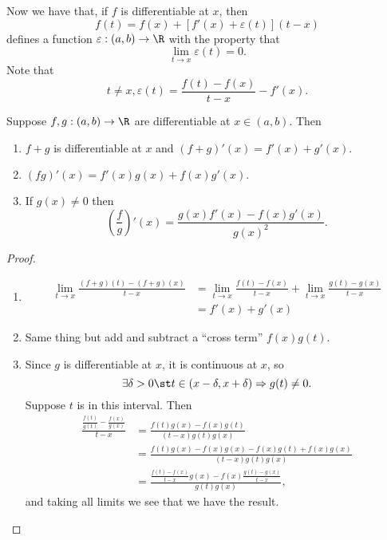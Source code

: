 \documentclass{notes}
\begin{document}
Now we have that, if $f$ is differentiable at $x$, then $$f(t) = f(x) + \left[ f'(x) + \varepsilon(t) \right]
(t-x)$$ defines a function $\varepsilon: (a,b) \to \R$ with the property that $$\lim_{t\to x} \varepsilon(t)
= 0.$$ Note that $$t\neq x, \varepsilon(t) = \frac{f(t) - f(x)}{t - x} - f'(x).$$

\begin{theorem}
  Suppose $f,g: (a,b) \to \R$ are differentiable at $x \in (a,b)$. Then 
  \begin{enumerate}
    \item $f + g$ is differentiable at $x$ and $(f + g)'(x) = f'(x) + g'(x)$.
    \item $(fg)'(x) = f'(x)g(x) + f(x)g'(x).$
    \item If $g(x) \neq 0$ then $$\left( \frac{f}{g} \right)'(x) = \frac{g(x)f'(x) - f(x)g'(x)}{g(x)^2}.$$
  \end{enumerate}
\end{theorem}
\begin{proof}\leavevmode
  \begin{enumerate}
    \item 
      \begin{align*}
        \lim_{t\to x} \frac{(f+g)(t) - (f+g)(x)}{t -x} &= \lim_{t\to x} \frac{f(t) - f(x)}{t - x} + \lim_{t\to x} \frac{g(t) - g(x)}{t - x} \\
        &= f'(x) + g'(x)
      \end{align*}

    \item Same thing but add and subtract a ``cross term'' $f(x)g(t)$.

    \item Since $g$ is differentiable at $x$, it is continuous at $x$, so 
      $$\exists \delta >0 \st t \in (x-\delta, x+\delta) \Rightarrow g(t) \neq 0.$$ Suppose $t$ is in 
      this interval. Then 
      \begin{align*}
        \frac{\frac{f(t)}{g(t)} - \frac{f(x)}{g(x)}}{t-x} &= \frac{f(t)g(x) - f(x)g(t)}{(t-x)g(t)g(x)} \\
                                        &= \frac{f(t)g(x) - f(x)g(x) - f(x)g(t) + f(x)g(x)}{(t-x)g(t)g(x)} \\
                                        &= \frac{\frac{f(t) - f(x)}{t-x}g(x) - f(x)\frac{g(t)-g(x)}{t-x}}{g(t)g(x)},
      \end{align*}
      and taking all limits we see that we have the result.
  \end{enumerate}
\end{proof}
\end{document}
